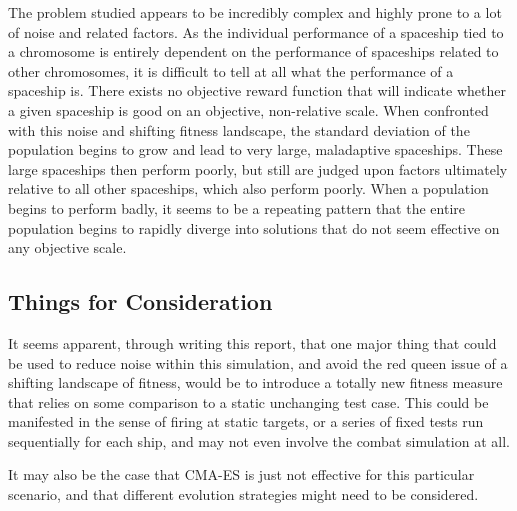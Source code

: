 \documentclass[a4paper]{article}
\begin{document}
The problem studied appears to be incredibly complex and highly prone to a lot of noise and related factors. As the individual performance of a spaceship tied to a chromosome is entirely dependent on the performance of spaceships related to other chromosomes, it is difficult to tell at all what the performance of a spaceship is. There exists no objective reward function that will indicate whether a given spaceship is good on an objective, non-relative scale. When confronted with this noise and shifting fitness landscape, the standard deviation of the population begins to grow and lead to very large, maladaptive spaceships. These large spaceships then perform poorly, but still are judged upon factors ultimately relative to all other spaceships, which also perform poorly. When a population begins to perform badly, it seems to be a repeating pattern that the entire population begins to rapidly diverge into solutions that do not seem effective on any objective scale.

\subsection{Things for Consideration}

It seems apparent, through writing this report, that one major thing that could be used to reduce noise within this simulation, and avoid the red queen issue of a shifting landscape of fitness, would be to introduce a totally new fitness measure that relies on some comparison to a static unchanging test case. This could be manifested in the sense of firing at static targets, or a series of fixed tests run sequentially for each ship, and may not even involve the combat simulation at all. 

It may also be the case that CMA-ES is just not effective for this particular scenario, and that different evolution strategies might need to be considered.
\end{document}
